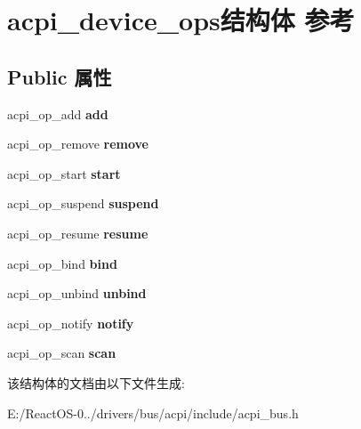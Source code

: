 \hypertarget{structacpi__device__ops}{}\section{acpi\+\_\+device\+\_\+ops结构体 参考}
\label{structacpi__device__ops}
\subsection*{Public 属性}
\begin{DoxyCompactItemize}
\item 
\mbox{\label{structacpi__device__ops_aa893b945cf30485601bb5c12d1eb0e01}} 
acpi\+\_\+op\+\_\+add {\bfseries add}
\item 
\mbox{\label{structacpi__device__ops_aff255dc96f31e852e1afa8316bbcab11}} 
acpi\+\_\+op\+\_\+remove {\bfseries remove}
\item 
\mbox{\label{structacpi__device__ops_a3ec68bccdaaa1a893f706781103e7f52}} 
acpi\+\_\+op\+\_\+start {\bfseries start}
\item 
\mbox{\label{structacpi__device__ops_a6d8866933451b8c2059ef2f4e2703f5a}} 
acpi\+\_\+op\+\_\+suspend {\bfseries suspend}
\item 
\mbox{\label{structacpi__device__ops_ae72854daf9df33e3584ada07282c22d4}} 
acpi\+\_\+op\+\_\+resume {\bfseries resume}
\item 
\mbox{\label{structacpi__device__ops_a6443ceb72e4c905c4e75f2d153cf926f}} 
acpi\+\_\+op\+\_\+bind {\bfseries bind}
\item 
\mbox{\label{structacpi__device__ops_a0fe500493b1615f828991fa5f54d31e8}} 
acpi\+\_\+op\+\_\+unbind {\bfseries unbind}
\item 
\mbox{\label{structacpi__device__ops_a5031f27aa166e072be2eacef62ec3105}} 
acpi\+\_\+op\+\_\+notify {\bfseries notify}
\item 
\mbox{\label{structacpi__device__ops_aed7e0463544d3a1625179e233a19261e}} 
acpi\+\_\+op\+\_\+scan {\bfseries scan}
\end{DoxyCompactItemize}


该结构体的文档由以下文件生成\+:\begin{DoxyCompactItemize}
\item 
E\+:/\+React\+O\+S-\/0../drivers/bus/acpi/include/acpi\+\_\+bus.\+h\end{DoxyCompactItemize}
